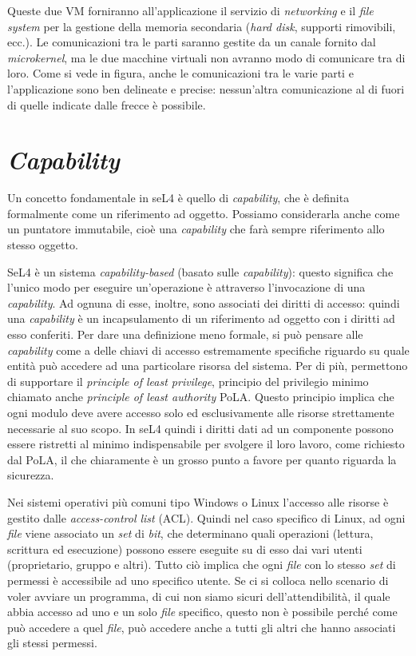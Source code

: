 Queste due VM forniranno all'applicazione il servizio di \textit{networking} e il \textit{file system} per la gestione della memoria secondaria (\textit{hard disk}, supporti rimovibili, ecc.). Le comunicazioni tra le parti saranno gestite da un canale fornito dal \textit{microkernel}, ma le due macchine virtuali non avranno modo di comunicare tra di loro. Come si vede in figura, anche le comunicazioni tra le varie parti e l'applicazione sono ben delineate e precise: nessun'altra comunicazione al di fuori di quelle indicate dalle frecce è possibile.

\section{\textit{\uppercase{C}apability}}
Un concetto fondamentale in seL4 è quello di \textit{capability}, che è definita formalmente come un riferimento ad oggetto. Possiamo considerarla anche come un puntatore immutabile, cioè una \textit{capability} che farà sempre riferimento allo stesso oggetto.

SeL4 è un sistema \textit{capability-based} (basato sulle \textit{capability}): questo significa che l'unico modo per eseguire un'operazione è attraverso l'invocazione di una \textit{capability}. Ad ognuna di esse, inoltre, sono associati dei diritti di accesso: quindi una \textit{capability} è un incapsulamento di un riferimento ad oggetto con i diritti ad esso conferiti.
Per dare una definizione meno formale, si può pensare alle \textit{capability} come a delle chiavi di accesso estremamente specifiche riguardo su quale entità può accedere ad una particolare risorsa del sistema. Per di più, permettono di supportare il \textit{principle of least privilege}, principio del privilegio minimo chiamato anche \textit{principle of least authority} PoLA. Questo principio implica che ogni modulo deve avere accesso solo ed esclusivamente alle risorse strettamente necessarie al suo scopo.
In seL4 quindi i diritti dati ad un componente possono essere ristretti al minimo indispensabile per svolgere il loro lavoro, come richiesto dal PoLA, il che chiaramente è un grosso punto a favore per quanto riguarda la sicurezza.

Nei sistemi operativi più comuni tipo Windows o Linux l'accesso alle risorse è gestito dalle \textit{access-control list} (ACL). Quindi nel caso specifico di Linux, ad ogni \textit{file} viene associato un \textit{set} di \textit{bit}, che determinano quali operazioni (lettura, scrittura ed esecuzione) possono essere eseguite su di esso dai vari utenti (proprietario, gruppo e altri). Tutto ciò implica che ogni \textit{file} con lo stesso \textit{set} di permessi è accessibile ad uno specifico utente. Se ci si colloca nello scenario di voler avviare un programma, di cui non siamo sicuri dell'attendibilità, il quale abbia accesso ad uno e un solo \textit{file} specifico, questo non è possibile perché come può accedere a quel \textit{file}, può accedere anche a tutti gli altri che hanno associati gli stessi permessi.

